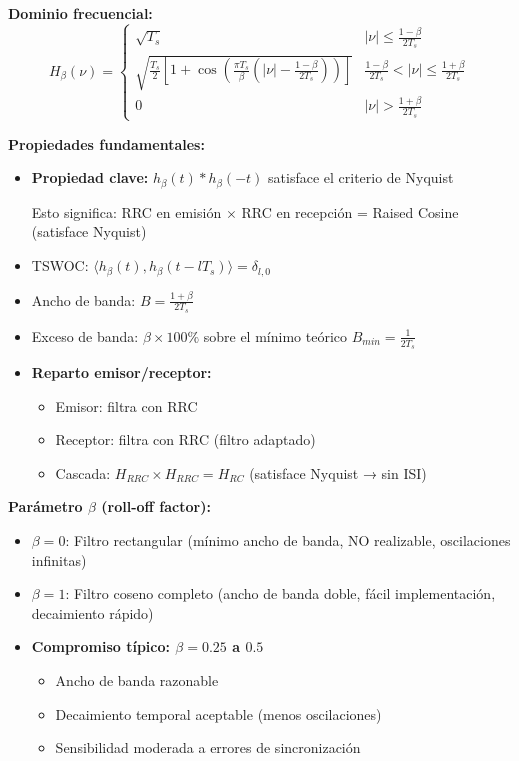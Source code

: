 \documentclass[10pt,a4paper]{article}
\begin{document}
\textbf{Dominio frecuencial:}
$$H_{\beta}(\nu) = \begin{cases}
\sqrt{T_s} & |\nu| \leq \frac{1-\beta}{2T_s}\\
\sqrt{\frac{T_s}{2}\left[1 + \cos\left(\frac{\pi T_s}{\beta}(|\nu| - \frac{1-\beta}{2T_s})\right)\right]} & \frac{1-\beta}{2T_s} < |\nu| \leq \frac{1+\beta}{2T_s}\\
0 & |\nu| > \frac{1+\beta}{2T_s}
\end{cases}$$

\textbf{Propiedades fundamentales:}
\begin{itemize}
\item \textbf{Propiedad clave:} $h_{\beta}(t) * h_{\beta}(-t)$ satisface el criterio de Nyquist

Esto significa: RRC en emisión $\times$ RRC en recepción = Raised Cosine (satisface Nyquist)

\item TSWOC: $\langle h_{\beta}(t), h_{\beta}(t-lT_s)\rangle = \delta_{l,0}$

\item Ancho de banda: $B = \frac{1+\beta}{2T_s}$

\item Exceso de banda: $\beta \times 100\%$ sobre el mínimo teórico $B_{min} = \frac{1}{2T_s}$

\item \textbf{Reparto emisor/receptor:} 
  \begin{itemize}
  \item Emisor: filtra con RRC
  \item Receptor: filtra con RRC (filtro adaptado)
  \item Cascada: $H_{RRC} \times H_{RRC} = H_{RC}$ (satisface Nyquist → sin ISI)
  \end{itemize}
\end{itemize}

\textbf{Parámetro $\beta$ (roll-off factor):}
\begin{itemize}
\item $\beta = 0$: Filtro rectangular (mínimo ancho de banda, NO realizable, oscilaciones infinitas)
\item $\beta = 1$: Filtro coseno completo (ancho de banda doble, fácil implementación, decaimiento rápido)
\item \textbf{Compromiso típico: $\beta = 0.25$ a $0.5$}
  \begin{itemize}
  \item Ancho de banda razonable
  \item Decaimiento temporal aceptable (menos oscilaciones)
  \item Sensibilidad moderada a errores de sincronización
  \end{itemize}
\end{itemize}
\end{document}
